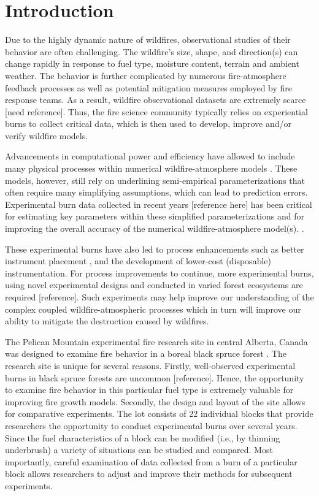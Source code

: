 \documentclass[preprints,article,accept,moreauthors,pdftex]{Definitions/mdpi}
\begin{document}
\section{Introduction}


Due to the highly dynamic nature of wildfires, observational studies of their behavior are often challenging. The wildfire's size, shape, and direction(s) can change rapidly in response to fuel type, moisture content, terrain and ambient weather. The behavior is further complicated by numerous fire-atmosphere feedback processes as well as potential mitigation measures employed by fire response teams. As a result, wildfire observational datasets are extremely scarce [need reference]. Thus, the fire science community typically relies on experiential burns to collect critical data, which is then used to develop, improve and/or verify wildfire models.

Advancements in computational power and efficiency have allowed to include many physical processes within numerical wildfire-atmosphere models \cite{kochanski_experimental_2018}. These models, however, still rely on underlining semi-empirical parameterizations that often require many simplifying assumptions, which can lead to prediction errors. Experimental burn data collected in recent years [reference here] has been critical for estimating key parameters within these simplified parameterizations and for improving the overall accuracy of the numerical wildfire-atmosphere model(s). \cite{kochanski_experimental_2018,mallia_incorporating_2020,kochanski_evaluation_2013,coen_requirements_2018}.

These experimental burns have also led to process enhancements such as better instrument placement \cite{kochanski_experimental_2018}, and the development of lower-cost (disposable) instrumentation. For process improvements to continue, more experimental burns, using novel experimental designs and conducted in varied forest ecosystems are required [reference]. Such experiments may help improve our understanding of the complex coupled wildfire-atmospheric processes which in turn will improve our ability to mitigate the destruction caused by wildfires.

The Pelican Mountain experimental fire research site in central Alberta, Canada was designed to examine fire behavior in a boreal black spruce forest \cite{thompson_recent_2020}. The research site is unique for several reasons. Firstly, well-observed experimental burns in black spruce forests are uncommon [reference]. Hence, the opportunity to examine fire behavior in this particular fuel type is extremely valuable for improving fire growth models. Secondly, the design and layout of the site allows for comparative experiments. The lot consists of 22 individual blocks that  provide researchers the opportunity to conduct experimental burns over  several years. Since the fuel characteristics of a block can be modified (i.e., by thinning underbrush) a variety of situations can be studied and compared. Most importantly, careful examination of data collected from a burn of a particular block allows researchers to  adjust and improve their methods for subsequent experiments.
\end{document}
